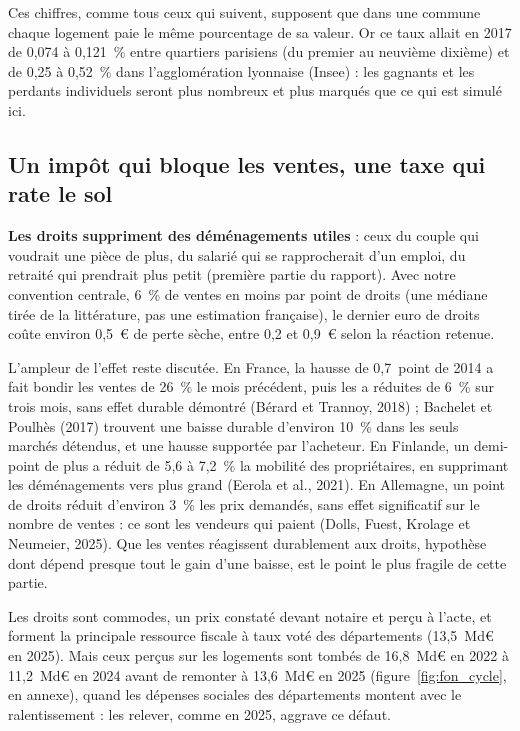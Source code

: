 \documentclass[11pt,a4paper]{article}
\begin{document}
Ces chiffres, comme tous ceux qui suivent, supposent que dans une commune chaque logement paie le même pourcentage de sa
valeur. Or ce taux allait en 2017 de 0,074 à 0,121~\% entre quartiers parisiens (du premier au neuvième dixième) et de
0,25 à 0,52~\% dans l'agglomération lyonnaise (Insee) : les gagnants et les perdants individuels seront plus nombreux et
plus marqués que ce qui est simulé ici.

\subsection{Un impôt qui bloque les ventes, une taxe qui rate le sol}

\textbf{Les droits suppriment des déménagements utiles} : ceux du couple qui voudrait une pièce de plus, du salarié qui
se rapprocherait d'un emploi, du retraité qui prendrait plus petit (première partie du rapport). Avec notre convention centrale, 6~\% de ventes en moins par point de droits (une médiane tirée de la
littérature, pas une estimation française), le dernier euro de droits coûte environ 0,5~€ de perte sèche, entre 0,2 et
0,9~€ selon la réaction retenue.

L'ampleur de l'effet reste discutée. En France, la hausse de 0,7~point de 2014 a fait
bondir les ventes de 26~\% le mois précédent, puis les a réduites de 6~\% sur trois mois, sans effet durable démontré
(Bérard et Trannoy, 2018) ; Bachelet et Poulhès (2017) trouvent une baisse durable d'environ 10~\% dans les seuls marchés
détendus, et une hausse supportée par l'acheteur. En Finlande, un demi-point de plus a réduit de 5,6 à 7,2~\% la mobilité
des propriétaires, en supprimant les déménagements vers plus grand (Eerola et al., 2021). En Allemagne, un point de droits
réduit d'environ 3~\% les prix demandés, sans effet significatif sur le nombre de ventes : ce sont les vendeurs qui paient
(Dolls, Fuest, Krolage et Neumeier, 2025). Que les ventes réagissent durablement aux droits, hypothèse dont dépend presque
tout le gain d'une baisse, est le point le plus fragile de cette partie.

Les droits sont commodes, un prix constaté devant notaire et perçu à l'acte, et forment la principale ressource fiscale
à taux voté des départements (13,5~Md€ en 2025). Mais ceux perçus sur les logements sont tombés de 16,8~Md€ en 2022 à
11,2~Md€ en 2024 avant de remonter à 13,6~Md€ en 2025 (figure~\ref{fig:fon_cycle}, en annexe), quand les dépenses
sociales des départements montent avec le ralentissement : les relever, comme en 2025, aggrave ce défaut.
\end{document}
